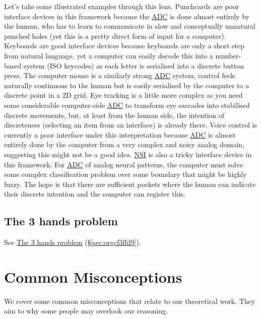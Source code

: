 \documentclass[logo,bsc,singlespacing,parskip]{infthesis}
\begin{document}
Let's take some illustrated examples through this lens.
Punchcards are poor interface devices in this framework because the \hyperref[orge86f149]{ADC} is done almost entirely by the human, who has to learn to communicate in slow and conceptually unnatural punched holes (yet this is a pretty direct form of input for a computer).
Keyboards are good interface devices because keyboards are only a short step from natural language, yet a computer can easily decode this into a number-based system (ISO keycodes) as each letter is serialised into a discrete button press.
The computer mouse is a similarly strong \hyperref[orge86f149]{ADC} system, control feels naturally continuous to the human but is easily serialised by the computer to a discrete point in a 2D grid.
Eye tracking is a little more complex as you need some considerable computer-side \hyperref[orge86f149]{ADC} to transform eye saccades into stabilised discrete movements, but, at least from the human side, the intention of discreteness (selecting an item from an interface) is already there.
Voice control is currently a poor interface under this interpretation because \hyperref[orge86f149]{ADC} is almost entirely done by the computer from a very complex and noisy analog domain, suggesting this might not be a good idea.
\hyperref[org559faaa]{NSI} is also a tricky interface device in this framework.
For \hyperref[orge86f149]{ADC} of analog neural patterns, the computer must solve some complex classification problem over some boundary that might be highly fuzzy.
The hope is that there are sufficient pockets where the human can indicate their discrete intention and the computer can register this.

\section{The 3 hands problem}
\label{sec:org86b33c4}

See \hyperref[sec:orgcf3ffd9]{The 3 hands problem} (\S \ref{sec:orgcf3ffd9}).
\chapter{Common Misconceptions}
\label{sec:org5797988}
We cover some common misconceptions that relate to our theoretical work.
They aim to why some people may overlook our reasoning.
\end{document}
